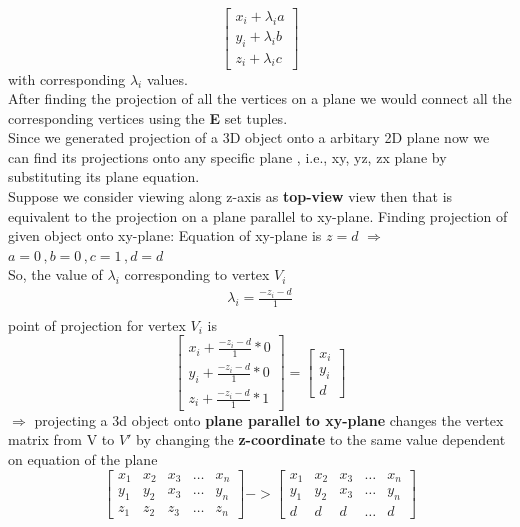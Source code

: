  $$ \begin{bmatrix}
         x_i+\lambda_{i} a  \\
         y_i+\lambda_{i} b   \\
         z_i+\lambda_{i} c 
  \end{bmatrix} $$ with corresponding $\lambda_{i}$ values. \\
After finding the projection of all the vertices on a plane we would connect all the corresponding vertices using the \textbf{E} set tuples.\\
Since we generated projection of a 3D object onto a arbitary 2D plane now we can find its projections onto any specific plane , i.e., xy, yz, zx plane by substituting its plane equation.\\
Suppose we consider viewing along z-axis as \textbf{top-view} view then that is equivalent to the projection on a plane parallel to xy-plane.
Finding projection of given object onto xy-plane:
Equation of xy-plane is \(z=d\) \qquad $\Rightarrow$ \(a=0\,,b=0\,,c=1\,,d=d\)\\
 So, the value of $\lambda_{i}$ corresponding to  vertex $V_{i} $
     \begin{gather}   
  \lambda_{i} = \frac{-z_i - d}{1}\\
   \end{gather}
 point of projection for vertex $V_{i}$ is 
   $$ \begin{bmatrix}
         x_i+\frac{-z_i -d}{1}*0  \\
         y_i+\frac{-z_i -d}{1}*0   \\
         z_i + \frac{-z_i - d}{1} * 1 
  \end{bmatrix} = \begin{bmatrix}
         x_i \\
         y_i \\
         d
  \end{bmatrix} $$
 $\Rightarrow$  projecting a 3d object onto \textbf{ plane parallel to xy-plane} changes the vertex matrix 
  from V to $V\prime $ by changing  the \textbf{z-coordinate} to the same value dependent on equation of  the plane\[
 \begin{bmatrix}
    x_{1}       & x_{2} & x_{3} & \dots & x_{n} \\
    y_{1}       & y_{2} & x_{3} & \dots & y_{n} \\
    z_{1}       & z_{2} & z_{3} & \dots & z_{n}
\end{bmatrix}
  -> \begin{bmatrix}
    x_{1}       & x_{2} & x_{3} & \dots & x_{n} \\
    y_{1}       & y_{2} & x_{3} & \dots & y_{n} \\
    d & d & d  & \dots & d
    \end{bmatrix}\]\\
